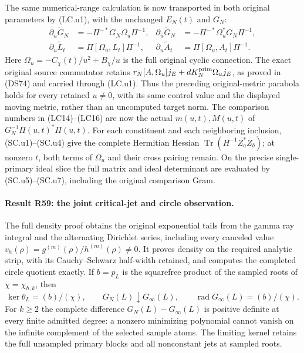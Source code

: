 The same numerical-range calculation is now transported in
both original parameters by (LC.u1), with the unchanged
\(E_N(t)\) and \(G_N\):
\[
 \begin{aligned}
 \partial_u\widetilde G_N
   &=-\Pi^{-*}G_N\Omega_u\Pi^{-1},&
 \partial_{\bar u}\widetilde G_N
   &=-\Pi^{-*}\Omega_u^*G_N\Pi^{-1},\\
 \partial_u\widetilde L_t
   &=\Pi[\Omega_u,L_t]\Pi^{-1},&
 \partial_u\widetilde A_t
   &=\Pi[\Omega_u,A_t]\Pi^{-1}.
 \end{aligned}
\]
Here \(\Omega_u=-C_\chi(t)/u^2+B_\chi/u\) is the full
original cyclic connection.  The exact original source
commutator retains
\(r_N[A,\Omega_u]j_E+dK_N^{\rm prim}\Omega_u j_E\),
as proved in (DS74) and carried through (LC.u1).
Thus the preceding original-metric parabola holds for every
retained \(u\ne0\), with its same control value and the
displayed moving metric, rather than an uncomputed target
norm.
The comparison numbers in (LC14)--(LC16) are now the actual
\(m(u,t),M(u,t)\) of \(G_N^{-1}\Pi(u,t)^*\Pi(u,t)\).
For each constituent and each neighboring inclusion,
(SC.u1)--(SC.u4) give the complete Hermitian Hessian
\(\operatorname{Tr}(H^{-1}Z_a^*Z_b)\);
at nonzero \(t\), both terms of \(\Omega_u\) and their
cross pairing remain.  On the precise single-primary ideal
slice the full matrix and ideal determinant are evaluated
by (SC.u5)--(SC.u7), including the original comparison Gram.


\paragraph{Result R59: the joint critical-jet and circle observation.}
The full density proof obtains the original exponential tails from
the gamma ray integral and the alternating Dirichlet series, including
every canceled value $v_h(\rho)=g^{(m)}(\rho)/h^{(m)}(\rho)\ne0$.
It proves density on the required analytic strip, with its
Cauchy--Schwarz half-width retained, and computes the completed circle
quotient exactly. If $b=p_L$ is the squarefree product of the sampled
roots of $\chi=\chi_{h,k}$, then
\[
 \ker\theta_L=(b)/(\chi),\qquad
 G_N(L)\downarrow G_\infty(L),\qquad
 \operatorname{rad}G_\infty(L)=(b)/(\chi).
\]
For $k\ge2$ the complete difference $G_N(L)-G_\infty(L)$ is
positive definite at every finite admitted degree: a nonzero
minimizing polynomial cannot vanish on the infinite complement of
the selected sample atoms. The limiting kernel retains the full
unsampled primary blocks and all nonconstant jets at sampled roots.

